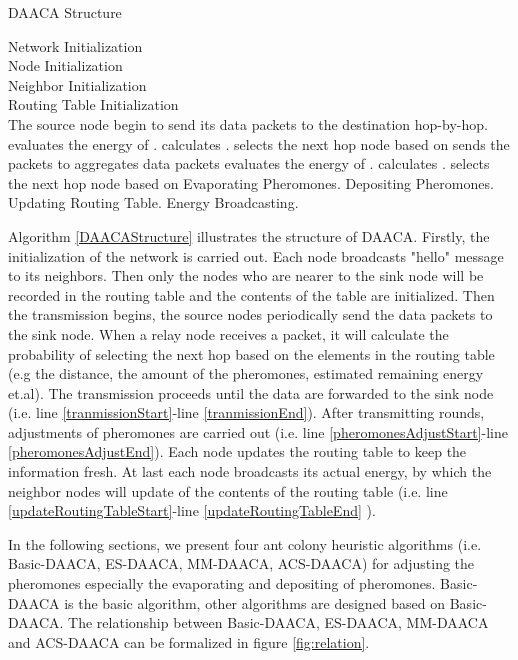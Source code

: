 \documentclass{elsarticle}
\begin{document}
\begin{algorithm}
\caption{DAACA Structure} \label{DAACAStructure}
\begin{algorithmic}[1]
\STATE Network Initialization \\ \label{networkInitialization}
Node Initialization \\
Neighbor Initialization \\
Routing Table Initialization \\
\STATE The source node begin to send its data packets to the destination hop-by-hop.
\FORALL {} \label{tranmissionStart}
\STATE  evaluates the energy of .
\STATE  calculates .
\STATE  selects the next hop node  based on 
\ENDFOR
\STATE    sends the packets to 
\WHILE {}
\STATE 
\STATE  aggregates data packets
\FORALL {}
\STATE  evaluates the energy of .
\STATE  calculates .
\STATE  selects the next hop node  based on 
\ENDFOR
\STATE 
\ENDWHILE \label{tranmissionEnd}
\STATE 
\IF { = } \label{pheromonesAdjustStart}
\STATE Evaporating Pheromones.
\STATE Depositing Pheromones.\label{pheromonesAdjustEnd}
\STATE Updating Routing Table. \label{updateRoutingTableStart}
\STATE Energy Broadcasting. \label{updateRoutingTableEnd}
\ENDIF
\end{algorithmic}
\end{algorithm}

Algorithm \ref{DAACAStructure} illustrates the structure of DAACA. Firstly, the initialization of the network is carried out. Each node broadcasts "hello" message to its neighbors. Then only the nodes who are nearer to the sink node will be recorded in the routing table and the contents of the table are initialized. Then the transmission begins, the source nodes periodically send the data packets to the sink node. When a relay node receives a packet, it will calculate the probability of selecting the next hop based on the elements in the routing table (e.g the distance, the amount of the pheromones, estimated remaining energy et.al). The transmission proceeds until the data are forwarded to the sink node (i.e. line \ref{tranmissionStart}-line \ref{tranmissionEnd}). After transmitting  rounds, adjustments of pheromones are carried out (i.e. line \ref{pheromonesAdjustStart}-line \ref{pheromonesAdjustEnd}). Each node updates the routing table to keep the information fresh. At last each node broadcasts its actual energy, by which the neighbor nodes will update of the contents of the routing table (i.e. line \ref{updateRoutingTableStart}-line \ref{updateRoutingTableEnd} ).

In the following sections, we present four ant colony heuristic algorithms (i.e. Basic-DAACA, ES-DAACA, MM-DAACA, ACS-DAACA) for adjusting the pheromones especially the evaporating and depositing of pheromones. Basic-DAACA is the basic algorithm, other algorithms are designed based on Basic-DAACA. The relationship between Basic-DAACA, ES-DAACA, MM-DAACA and ACS-DAACA can be formalized in figure \ref{fig:relation}.
\end{document}
